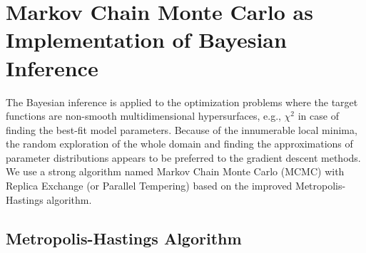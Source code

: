 \documentclass[preprint2]{aastex}
\begin{document}
\section{Markov Chain Monte Carlo as Implementation of Bayesian Inference}

The Bayesian inference is applied to the optimization problems where the target functions are non-smooth multidimensional hypersurfaces, e.g., $\chi^2$ in case of finding the best-fit model parameters. Because of the innumerable local minima, the random exploration of the whole domain and finding the approximations of parameter distributions appears to be preferred to the gradient descent methods. 
We use a strong algorithm named Markov Chain Monte Carlo (MCMC) with Replica Exchange (or Parallel Tempering) based on the improved Metropolis-Hastings algorithm. 


\subsection{Metropolis-Hastings Algorithm}
\end{document}
